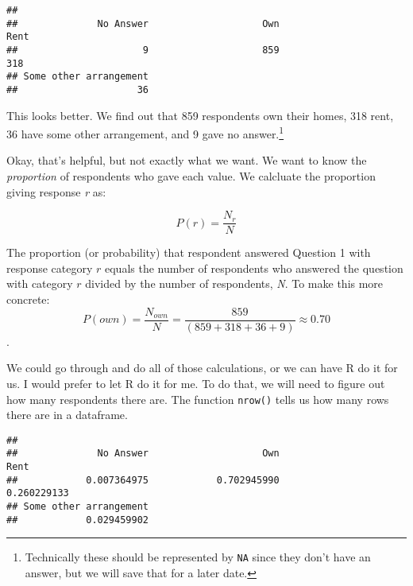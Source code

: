\documentclass[]{article}
\newenvironment{Shaded}{\begin{snugshade}}{\end{snugshade}}
\newcommand{\KeywordTok}[1]{\textcolor[rgb]{0.13,0.29,0.53}{\textbf{{#1}}}}
\newcommand{\StringTok}[1]{\textcolor[rgb]{0.31,0.60,0.02}{{#1}}}
\newcommand{\NormalTok}[1]{{#1}}
\let\rmarkdownfootnote\footnote%
\def\footnote{\protect\rmarkdownfootnote}
\begin{document}
\begin{Shaded}
\end{Shaded}

\begin{verbatim}
## 
##              No Answer                    Own                   Rent 
##                      9                    859                    318 
## Some other arrangement 
##                     36
\end{verbatim}

This looks better. We find out that 859 respondents own their homes, 318
rent, 36 have some other arrangement, and 9 gave no answer.\footnote{Technically
  these should be represented by \texttt{NA} since they don't have an
  answer, but we will save that for a later date.}

Okay, that's helpful, but not exactly what we want. We want to know the
\emph{proportion} of respondents who gave each value. We calcluate the
proportion giving response \emph{r} as:

\[P(r) = \frac{N_r}{N}\]

The proportion (or probability) that respondent answered Question 1 with
response category \(r\) equals the number of respondents who answered
the question with category \(r\) divided by the number of respondents,
\emph{N}. To make this more concrete:
\[P(own)=\frac{N_{own}}{N}=\frac{859}{(859+318+36+9)}\approx0.70\].

We could go through and do all of those calculations, or we can have R
do it for us. I would prefer to let R do it for me. To do that, we will
need to figure out how many respondents there are. The function
\texttt{nrow()} tells us how many rows there are in a dataframe.

\begin{Shaded}
\end{Shaded}

\begin{verbatim}
## 
##              No Answer                    Own                   Rent 
##            0.007364975            0.702945990            0.260229133 
## Some other arrangement 
##            0.029459902
\end{verbatim}
\end{document}

